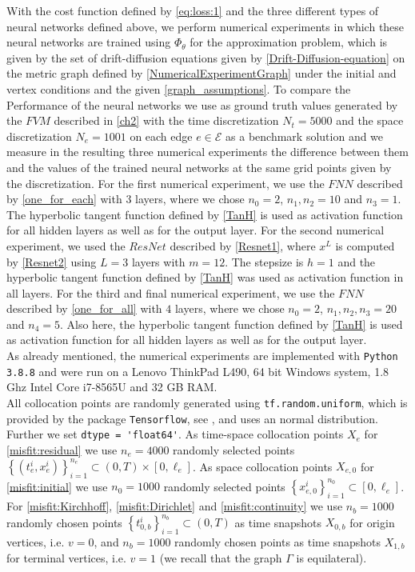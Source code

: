 With the cost function defined by \cref{eq:loss:1} and the three different types of neural networks defined above, we perform numerical experiments in which these neural networks are trained using $\Phi_{\theta}$ for the approximation problem, which is given by the set of drift-diffusion equations given by \cref{Drift-Diffusion-equation} on the metric graph defined by \cref{NumericalExperimentGraph} under the initial and vertex conditions and the given \cref{graph_assumptions}. To compare the Performance of the neural networks we use as ground truth values generated by the $FVM$ described in \cref{ch2} with the time discretization $N_t = 5000$ and the space discretization $N_e = 1001$ on each edge $e \in \mathcal{E}$ as a benchmark solution and we measure in the resulting three numerical experiments the difference between them and the values of the trained neural networks at the same grid points given by the discretization. For the first numerical experiment, we use the $FNN$ described by \cref{one_for_each} with $3$ layers, where we chose $n_0 = 2$, $n_1, n_2 = 10$ and $n_3 = 1$. The hyperbolic tangent function defined by \cref{TanH} is used as activation function for all hidden layers as well as for the output layer. For the second numerical experiment, we used the $ResNet$ described by \cref{Resnet1}, where $x^L$ is computed by \cref{Resnet2} using $L = 3$ layers with $m = 12$. The stepsize is $h=1$ and the hyperbolic tangent function defined by \cref{TanH} was used as activation function in all layers. For the third and final numerical experiment, we use the $FNN$ described by \cref{one_for_all} with $4$ layers, where we chose $n_0 = 2$, $n_1, n_2, n_3 = 20$ and $n_4 = 5$. Also here, the hyperbolic tangent function defined by \cref{TanH} is used as activation function for all hidden layers as well as for the output layer. \\
As already mentioned, the numerical experiments are implemented with \lstinline!Python 3.8.8! and were run on a Lenovo ThinkPad L490, 64 bit Windows system, 1.8 Ghz Intel Core i7-8565U and 32 GB RAM. \\
All collocation points are randomly generated using \lstinline!tf.random.uniform!, which is provided by the package \lstinline!Tensorflow!, see \cite{TensorFlow}, and uses an normal distribution. Further we set \lstinline!dtype = 'float64'!. As time-space collocation points $X_e$ for \cref{misfit:residual} we use $n_e = 4000$ randomly selected points $\left\{ \left( t_e^i, x_e^i \right) \right\}_{i=1}^{n_e} \subset \left( 0, T \right) \times \left[0, \ell_e\right]$. As space collocation points $X_{e,0}$ for \cref{misfit:initial} we use $n_0 = 1000$ randomly selected points $ \left\{ x_{e,0}^i \right\}_{i=1}^{n_0} \subset \left[0, \ell_e\right]$. For \cref{misfit:Kirchhoff}, \cref{misfit:Dirichlet} and \cref{misfit:continuity} we use $n_b = 1000$ randomly chosen points $\left\{ t_{0,b}^i \right\}_{i=1}^{n_b} \subset \left( 0,T \right)$ as time snapshots $X_{0,b}$ for origin vertices, i.e. $v = 0$, and $n_b = 1000$ randomly chosen points as time snapshots $X_{1,b}$ for terminal vertices, i.e. $v = 1$ (we recall that the graph $\Gamma$ is equilateral). \\
